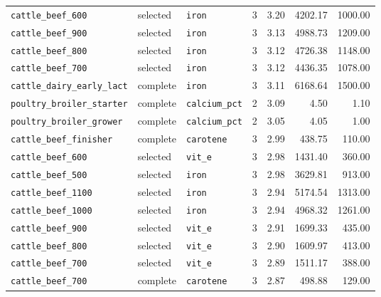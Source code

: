 \documentclass[11pt]{article}
\begin{document}
\begin{longtable}{lllccrr}
\texttt{cattle\_beef\_600} & selected & \texttt{iron} & 3 & 3.20 & 4202.17 & 1000.00 \\
\texttt{cattle\_beef\_900} & selected & \texttt{iron} & 3 & 3.13 & 4988.73 & 1209.00 \\
\texttt{cattle\_beef\_800} & selected & \texttt{iron} & 3 & 3.12 & 4726.38 & 1148.00 \\
\texttt{cattle\_beef\_700} & selected & \texttt{iron} & 3 & 3.12 & 4436.35 & 1078.00 \\
\texttt{cattle\_dairy\_early\_lact} & complete & \texttt{iron} & 3 & 3.11 & 6168.64 & 1500.00 \\
\texttt{poultry\_broiler\_starter} & complete & \texttt{calcium\_pct} & 2 & 3.09 & 4.50 & 1.10 \\
\texttt{poultry\_broiler\_grower} & complete & \texttt{calcium\_pct} & 2 & 3.05 & 4.05 & 1.00 \\
\texttt{cattle\_beef\_finisher} & complete & \texttt{carotene} & 3 & 2.99 & 438.75 & 110.00 \\
\texttt{cattle\_beef\_600} & selected & \texttt{vit\_e} & 3 & 2.98 & 1431.40 & 360.00 \\
\texttt{cattle\_beef\_500} & selected & \texttt{iron} & 3 & 2.98 & 3629.81 & 913.00 \\
\texttt{cattle\_beef\_1100} & selected & \texttt{iron} & 3 & 2.94 & 5174.54 & 1313.00 \\
\texttt{cattle\_beef\_1000} & selected & \texttt{iron} & 3 & 2.94 & 4968.32 & 1261.00 \\
\texttt{cattle\_beef\_900} & selected & \texttt{vit\_e} & 3 & 2.91 & 1699.33 & 435.00 \\
\texttt{cattle\_beef\_800} & selected & \texttt{vit\_e} & 3 & 2.90 & 1609.97 & 413.00 \\
\texttt{cattle\_beef\_700} & selected & \texttt{vit\_e} & 3 & 2.89 & 1511.17 & 388.00 \\
\texttt{cattle\_beef\_700} & complete & \texttt{carotene} & 3 & 2.87 & 498.88 & 129.00 \\
\end{longtable}
\end{document}
